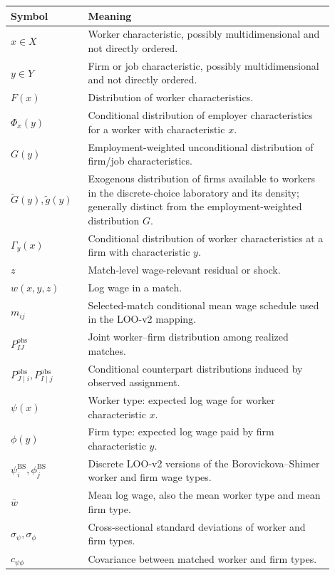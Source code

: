 \documentclass[11pt]{article}
\begin{document}
\begin{center}
\begin{tabular}{>{\raggedright\arraybackslash}p{0.20\linewidth}p{0.70\linewidth}}
\toprule
Symbol & Meaning \\
\midrule
$x\in X$ & Worker characteristic, possibly multidimensional and not directly ordered. \\
$y\in Y$ & Firm or job characteristic, possibly multidimensional and not directly ordered. \\
$F(x)$ & Distribution of worker characteristics. \\
$\Phi_x(y)$ & Conditional distribution of employer characteristics for a worker with characteristic $x$. \\
$G(y)$ & Employment-weighted unconditional distribution of firm/job characteristics. \\
$\widetilde G(y),\widetilde g(y)$ & Exogenous distribution of firms available
to workers in the discrete-choice laboratory and its density; generally
distinct from the employment-weighted distribution $G$. \\
$\Gamma_y(x)$ & Conditional distribution of worker characteristics at a firm with characteristic $y$. \\
$z$ & Match-level wage-relevant residual or shock. \\
$w(x,y,z)$ & Log wage in a match. \\
$m_{ij}$ & Selected-match conditional mean wage schedule used in the LOO-v2 mapping. \\
$P_{IJ}^{\mathrm{obs}}$ & Joint worker--firm distribution among realized matches. \\
$P_{J\mid i}^{\mathrm{obs}},P_{I\mid j}^{\mathrm{obs}}$ & Conditional counterpart distributions induced by observed assignment. \\
$\psi(x)$ & Worker type: expected log wage for worker characteristic $x$. \\
$\phi(y)$ & Firm type: expected log wage paid by firm characteristic $y$. \\
$\psi_i^{\mathrm{BS}},\phi_j^{\mathrm{BS}}$ & Discrete LOO-v2 versions of the Borovickova--Shimer worker and firm wage types. \\
$\bar w$ & Mean log wage, also the mean worker type and mean firm type. \\
$\sigma_\psi,\sigma_\phi$ & Cross-sectional standard deviations of worker and firm types. \\
$c_{\psi\phi}$ & Covariance between matched worker and firm types. \\

\end{tabular}
\end{center}
\end{document}
